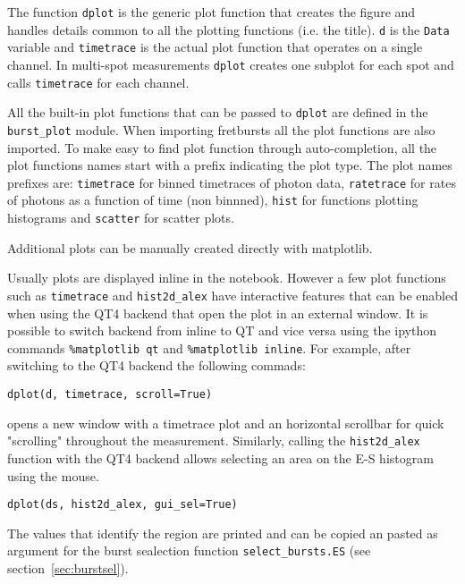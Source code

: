 The function \verb|dplot| is the generic plot function that creates the figure and handles details common to all the plotting functions (i.e. the title). \verb|d| is the \verb|Data| variable and \verb|timetrace| is the actual plot function that operates on a single channel. In multi-spot measurements \verb|dplot| creates one subplot for each spot and calls \verb|timetrace| for each channel.

All the built-in plot functions that can be passed to \verb|dplot| are defined in the \verb|burst_plot| module. When importing fretbursts all the plot functions are also imported. To make easy to find plot function through auto-completion, all the plot functions names start with a prefix indicating the plot type. The plot names prefixes are: \verb|timetrace| for binned timetraces of photon data, \verb|ratetrace| for rates of photons as a function of time (non binnned), \verb|hist| for functions plotting histograms and \verb|scatter| for scatter plots.

Additional plots can be manually created directly with matplotlib.

Usually plots are displayed inline in the notebook. However a few plot functions  such as \verb|timetrace| and \verb|hist2d_alex|  have interactive features that can be enabled when using the QT4 backend that open the plot in an external window. It is possible to switch backend from inline to QT and vice versa using the ipython commands \verb|%matplotlib qt|
and \verb|%matplotlib inline|. For example, after switching to the QT4 backend the following commads:

\begin{verbatim}
dplot(d, timetrace, scroll=True)
\end{verbatim}

opens a new window with a timetrace plot and an horizontal scrollbar for quick "scrolling" throughout the measurement.
Similarly, calling the \verb|hist2d_alex| function with the QT4 backend allows selecting an area on the E-S histogram using the mouse.

\begin{verbatim}
dplot(ds, hist2d_alex, gui_sel=True)
\end{verbatim}

The values that identify the region are printed and can be copied an pasted as argument for the burst sealection function \verb|select_bursts.ES| (see section~\ref{sec:burstsel}).